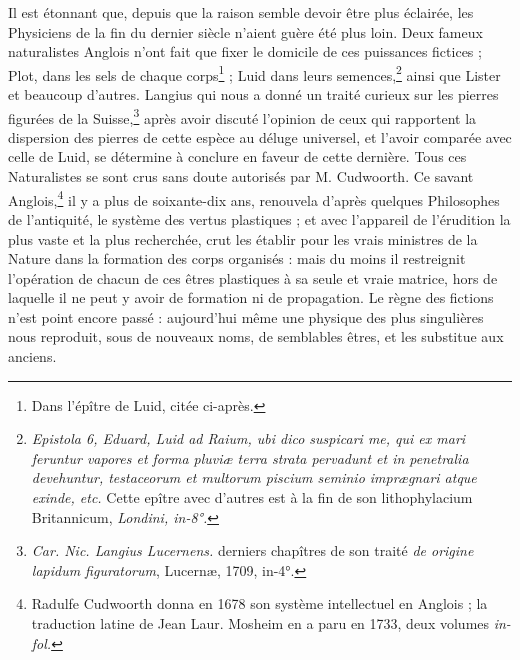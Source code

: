 \documentclass[a4paper, 11pt, oneside, polutonikogreek, french]{article}
\begin{document}
Il est étonnant que, depuis que la raison semble devoir être plus éclairée, les Physiciens de la fin du dernier siècle n'aient guère été plus loin. Deux fameux naturalistes Anglois n'ont fait que fixer le domicile de ces puissances fictices ; Plot, dans les sels de chaque corps\footnote{Dans l'épître de Luid, citée ci-après.} ; Luid dans leurs semences,\footnote{\emph{Epistola 6, Eduard, Luid ad Raium, ubi dico suspicari me, qui ex mari feruntur vapores et forma pluviæ terra strata pervadunt et in penetralia devehuntur, testaceorum et multorum piscium seminio imprægnari atque exinde, etc.} Cette epître avec d'autres est à la fin de son lithophylacium Britannicum, \emph{Londini, in-8°.}} ainsi que Lister et beaucoup d'autres. Langius qui nous a donné un traité curieux sur les pierres figurées de la Suisse,\footnote{\emph{Car. Nic. Langius Lucernens.} derniers chapîtres de son traité \emph{de origine lapidum figuratorum}, Lucernæ, 1709, in-4°.} après avoir discuté l'opinion de ceux qui rapportent la dispersion des pierres de cette espèce au déluge universel, et l'avoir comparée avec celle de Luid, se détermine à conclure en faveur de cette dernière. Tous ces Naturalistes se sont crus sans doute autorisés par M. Cudwoorth. Ce savant Anglois,\footnote{Radulfe Cudwoorth donna en 1678 son système intellectuel en Anglois ; la traduction latine de Jean Laur. Mosheim en a paru en 1733, deux volumes \emph{in-fol.}} il y a plus de soixante-dix ans, renouvela d'après quelques Philosophes de l'antiquité, le système des vertus plastiques ; et avec l'appareil de l'érudition la plus vaste et la plus recherchée, crut les établir pour les vrais ministres de la Nature dans la formation des corps organisés : mais du moins il restreignit l'opération de chacun de ces êtres plastiques à sa seule et vraie matrice, hors de laquelle il ne peut y avoir de formation ni de propagation. Le règne des fictions n'est point encore passé : aujourd'hui même une physique des plus singulières nous reproduit, sous de nouveaux noms, de semblables êtres, et les substitue aux anciens.
\end{document}
